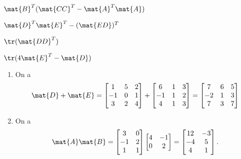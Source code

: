 \begin{exercice}
\begin{enumerate}
\begin{multicols}{2}
    \item $\mat{B}^T (\mat{CC}^T - \mat{A}^T \mat{A})$
    \item $\mat{D}^T \mat{E}^T - (\mat{ED})^T$
    \end{multicols}
    \vspace{-1.5\baselineskip}
    \begin{multicols}{2}
    \item $\tr(\mat{DD}^T)$
    \item $\tr(4 \mat{E}^T - \mat{D})$
    \end{multicols}
  \end{enumerate}
  \begin{sol}
    \begin{enumerate}
    \item On a
      \begin{displaymath}
        \mat{D} + \mat{E}
        =
        \begin{bmatrix}
          1 & 5 & 2 \\ -1 & 0 & 1 \\ 3 & 2 & 4
        \end{bmatrix} +
        \begin{bmatrix}
          6 & 1 & 3 \\ -1 & 1 & 2 \\ 4 & 1 & 3
        \end{bmatrix}
        =
        \begin{bmatrix}
          7 & 6 & 5 \\ -2 & 1 & 3 \\ 7 & 3 & 7
        \end{bmatrix}
      \end{displaymath}
    \item On a
      \begin{displaymath}
        \mat{A} \mat{B}
        =
        \begin{bmatrix}
          3 & 0 \\ -1 & 2 \\ 1 & 1
        \end{bmatrix}
        \begin{bmatrix}
          4 & -1 \\ 0 & 2
        \end{bmatrix}
        =
        \begin{bmatrix}
          12 & -3 \\ -4 & 5 \\ 4 & 1
        \end{bmatrix}.
      \end{displaymath}

\end{enumerate}
\end{sol}
\end{exercice}
